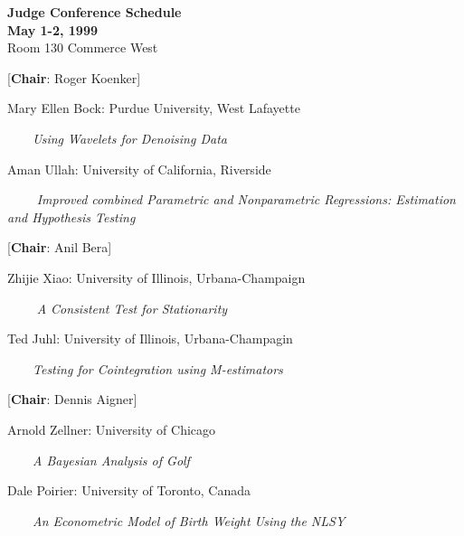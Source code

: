
\setlength{\textwidth}{170mm}
\setlength{\textheight}{230mm}
\setlength{\oddsidemargin}{0mm}
\setlength{\evensidemargin}{-10mm}
\setlength{\topmargin}{0mm}
\renewcommand{\baselinestretch}{1}
\newcommand{\REF}{\nopagebreak\noindent{\large{\bf
      References}}\vspace{.2in}}

\pagestyle{empty}


\begin{center}
{\bf Judge Conference Schedule\\
May 1-2, 1999}\\
Room 130 Commerce West

\vspace{5mm}
\end{center}

[{\bf Chair}: Roger Koenker]

Mary Ellen Bock: Purdue University, West Lafayette

$\qquad${\em Using Wavelets for Denoising Data}

Aman Ullah:  University of California, Riverside

$\qquad $ \small{{\em Improved combined Parametric and Nonparametric Regressions:  Estimation and Hypothesis Testing}}

\normalsize
{} %

[{\bf Chair}: Anil Bera]

Zhijie Xiao: University of Illinois, Urbana-Champaign

$\qquad$ {\em A Consistent Test for Stationarity}

Ted Juhl:  University of Illinois, Urbana-Champagin

$\qquad ${\em Testing for Cointegration using M-estimators}


[{\bf Chair}: Dennis Aigner]

Arnold  Zellner:   University  of Chicago

$\qquad ${\em A Bayesian Analysis of Golf}

Dale Poirier:  University of  Toronto, Canada

$\qquad ${\em An Econometric Model of Birth Weight Using the NLSY}

